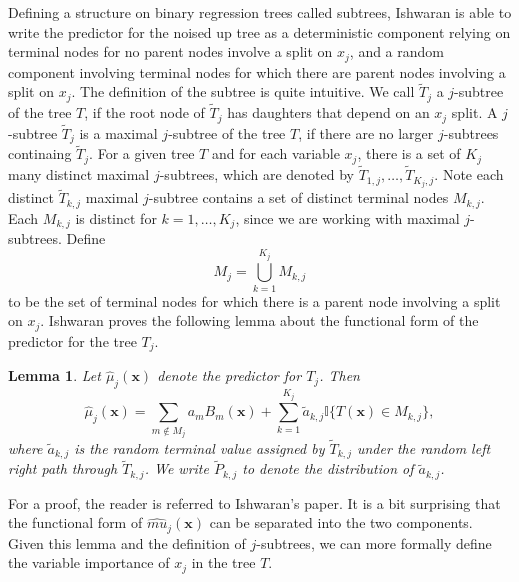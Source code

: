 \documentclass[12pt,twoside]{reedthesis}
\newtheorem{lemma}{Lemma}[chapter]
\theoremstyle{definition}
\theoremstyle{definition}
\theoremstyle{definition}
\theoremstyle{remark}
\begin{document}
Defining a structure on binary regression trees called subtrees,
Ishwaran is able to write the predictor for the noised up tree as a
deterministic component relying on terminal nodes for no parent nodes
involve a split on \(x_j\), and a random component involving terminal
nodes for which there are parent nodes involving a split on \(x_j\). The
definition of the subtree is quite intuitive. We call \(\tilde{T}_j\) a
\(j\)-subtree of the tree \(T\), if the root node of \(\tilde{T}_j\) has
daughters that depend on an \(x_j\) split. A \(j\)-subtree
\(\tilde{T}_j\) is a maximal \(j\)-subtree of the tree \(T\), if there
are no larger \(j\)-subtrees continaing \(\tilde{T}_j\). For a given
tree \(T\) and for each variable \(x_j\), there is a set of \(K_j\) many
distinct maximal \(j\)-subtrees, which are denoted by
\(\tilde{T}_{1,j},\ldots, \tilde{T}_{K_j,j}\). Note each distinct
\(\tilde{T}_{k,j}\) maximal \(j\)-subtree contains a set of distinct
terminal nodes \(M_{k,j}\). Each \(M_{k,j}\) is distinct for
\(k=1,\ldots,K_j\), since we are working with maximal \(j\)-subtrees.
Define \[M_j=\bigcup_{k=1}^{K_j} M_{k,j}\] to be the set of terminal
nodes for which there is a parent node involving a split on \(x_j\).
Ishwaran proves the following lemma about the functional form of the
predictor for the tree \(T_j\).
\begin{lemma}
Let $\hat{\mu}_j(\mathbf{x})$ denote the predictor for $T_j$. Then $$\hat{\mu}_j(\mathbf{x})=\sum_{m\notin M_j}a_m B_m(\mathbf{x})+\sum_{k=1}^{K_j} \tilde{a}_{k,j}\mathbb{I}\{T(\mathbf{x})\in M_{k,j}\},$$ where $\tilde{a}_{k,j}$ is the random terminal value assigned by $\tilde{T}_{k,j}$ under the random left right path through $\tilde{T}_{k,j}$. We write $\tilde{P}_{k,j}$ to denote the distribution of $\tilde{a}_{k,j}$. 
\end{lemma}
For a proof, the reader is referred to Ishwaran's paper. It is a bit
surprising that the functional form of \(\hat{mu}_j(\mathbf{x})\) can be
separated into the two components. Given this lemma and the definition
of \(j\)-subtrees, we can more formally define the variable importance
of \(x_j\) in the tree \(T\).
\end{document}
